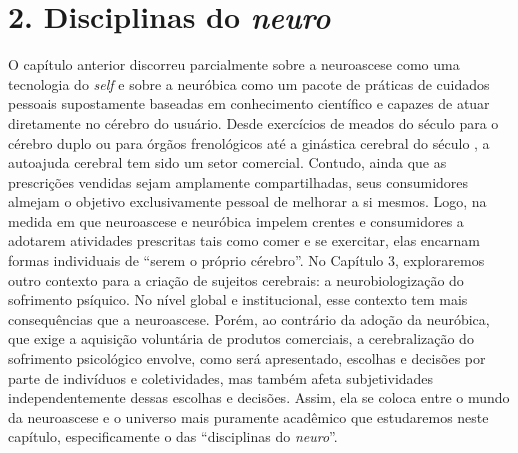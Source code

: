 \chapter{2. Disciplinas do \emph{neuro}}

O capítulo anterior discorreu parcialmente sobre a neuroascese como uma
tecnologia do \emph{self} e sobre a neuróbica como um pacote de práticas de
cuidados pessoais supostamente baseadas em conhecimento científico e
capazes de atuar diretamente no cérebro do usuário. Desde exercícios de
meados do século  para o cérebro duplo ou para órgãos frenológicos
até a ginástica cerebral do século , a autoajuda cerebral tem sido um
setor comercial. Contudo, ainda que as prescrições vendidas sejam
amplamente compartilhadas, seus consumidores almejam o objetivo
exclusivamente pessoal de melhorar a si mesmos. Logo, na medida em que
neuroascese e neuróbica impelem crentes e consumidores a adotarem
atividades prescritas tais como comer e se exercitar, elas encarnam
formas individuais de ``serem o próprio cérebro''. No Capítulo 3, exploraremos
outro contexto para a criação de sujeitos cerebrais: a
neurobiologização do sofrimento psíquico. No nível global e
institucional, esse contexto tem mais consequências que a neuroascese.
Porém, ao contrário da adoção da neuróbica, que exige a aquisição
voluntária de produtos comerciais, a cerebralização do sofrimento
psicológico envolve, como será apresentado, escolhas e decisões por
parte de indivíduos e coletividades, mas também afeta subjetividades
independentemente dessas escolhas e decisões. Assim, ela se coloca entre
o mundo da neuroascese e o universo mais puramente acadêmico que estudaremos
neste capítulo, especificamente o das ``disciplinas do
\emph{neuro}''.


